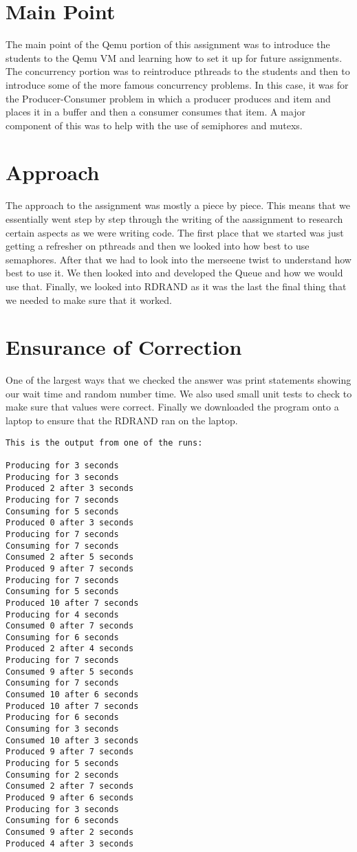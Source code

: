 \documentclass[10pt,onecolumn]{article}
\begin{document}
\section{Main Point}
The main point of the Qemu portion of this assignment was to introduce the students to the Qemu VM and learning how to set it up for future assignments. The concurrency portion was to reintroduce pthreads to the students and then to introduce some of the more famous concurrency problems. In this case, it was for the Producer-Consumer problem in which a producer produces and item and places it in a buffer and then a consumer consumes that item. A major component of this was to help with the use of semiphores and mutexs.

\section{Approach}
The approach to the assignment was mostly a piece by piece. This means that we essentially went step by step through the writing of the aassignment to research certain aspects as we were writing code. The first place that we started was just getting a refresher on pthreads and then we looked into how best to use semaphores. After that we had to look into the merseene twist to understand how best to use it. We then looked into and developed the Queue and how we would use that. Finally, we looked into RDRAND as it was the last the final thing that we needed to make sure that it worked.

\section{Ensurance of Correction}
One of the largest ways that we checked the answer was print statements showing our wait time and random number time. We also used small unit tests to check to make sure that values were correct. Finally we downloaded the program onto a laptop to ensure that the RDRAND ran on the laptop.

\begin{verbatim}
This is the output from one of the runs:

Producing for 3 seconds
Producing for 3 seconds
Produced 2 after 3 seconds
Producing for 7 seconds
Consuming for 5 seconds
Produced 0 after 3 seconds
Producing for 7 seconds
Consuming for 7 seconds
Consumed 2 after 5 seconds
Produced 9 after 7 seconds
Producing for 7 seconds
Consuming for 5 seconds
Produced 10 after 7 seconds
Producing for 4 seconds
Consumed 0 after 7 seconds
Consuming for 6 seconds
Produced 2 after 4 seconds
Producing for 7 seconds
Consumed 9 after 5 seconds
Consuming for 7 seconds
Consumed 10 after 6 seconds
Produced 10 after 7 seconds
Producing for 6 seconds
Consuming for 3 seconds
Consumed 10 after 3 seconds
Produced 9 after 7 seconds
Producing for 5 seconds
Consuming for 2 seconds
Consumed 2 after 7 seconds
Produced 9 after 6 seconds
Producing for 3 seconds
Consuming for 6 seconds
Consumed 9 after 2 seconds
Produced 4 after 3 seconds

\end{verbatim}
\end{document}
